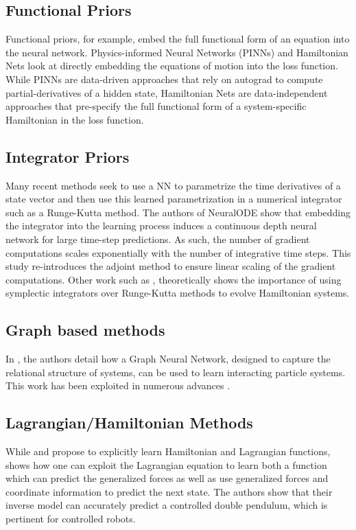 \documentclass[twoside]{article}
\begin{document}
\subsection*{Functional Priors}
Functional priors, for example, embed the full functional form of an equation into the neural network. Physics-informed Neural Networks (PINNs) \cite{raissi_physics_2017,raissi_physics-informed_2019} and Hamiltonian Nets \cite{mattheakis_hamiltonian_2020} look at directly embedding the equations of motion into the loss function. While PINNs are data-driven approaches that rely on autograd to compute partial-derivatives of a hidden state, Hamiltonian Nets are data-independent approaches that pre-specify the full functional form of a system-specific Hamiltonian in the loss function.

\subsection*{Integrator Priors}
Many recent methods seek to use a NN to parametrize the time derivatives of a state vector and then use this learned parametrization in a numerical integrator such as a Runge-Kutta method. The authors of NeuralODE \cite{chen_neural_2018} show that embedding the integrator into the learning process induces a continuous depth neural network for large time-step predictions. As such, the number of gradient computations scales exponentially with the number of integrative time steps. This study re-introduces the adjoint method to ensure linear scaling of the gradient computations. Other work such as \cite{zhu_deep_2020}, theoretically shows the importance of using symplectic integrators over Runge-Kutta methods to evolve Hamiltonian systems.

\subsection*{Graph based methods}
In \cite{battaglia_interaction_2016}, the authors detail how a Graph Neural Network, designed to capture the relational structure of systems, can be used to learn interacting particle systems. This work has been exploited in numerous advances \cite{sanchez-gonzalez_graph_2018,sanchez-gonzalez_learning_2020,cranmer_lagrangian_2020}.

\subsection*{Lagrangian/Hamiltonian Methods}
While \cite{cranmer_lagrangian_2020} and \cite{greydanus_hamiltonian_2019} propose to explicitly learn Hamiltonian and Lagrangian functions, \cite{lutter_deep_2019} shows how one can exploit the Lagrangian equation to learn both a function which can predict the generalized forces as well as use generalized forces and coordinate information to predict the next state. The authors show that their inverse model can accurately predict a controlled double pendulum, which is pertinent for controlled robots.
\end{document}
